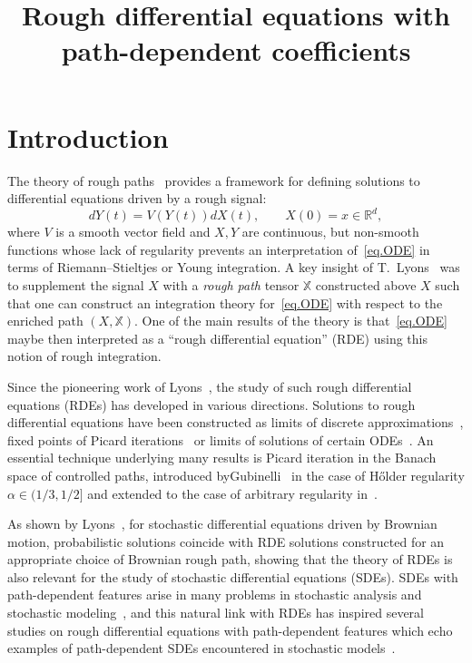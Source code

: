 \documentclass[AHL,Unicode,longabstracts,published]{cedram}
\title[Path-dependent RDEs]{Rough differential equations with path-dependent coefficients}
\author[A. Ananova]{\firstname{Anna} \lastname{Ananova}}
\newcommand{\bbX}{\mathbb{X}}
\newcommand{\Rr}{{\mathbb{R}}}
\begin{document}
\maketitle




\section{Introduction}

The theory of rough paths~\cite{lyons} provides a framework for defining solutions to differential equations driven by a rough signal:
\begin{equation}\label{eq.ODE}
dY(t)= V(Y(t)) dX(t),\qquad X(0)=x\in \Rr^d,
\end{equation}
where $V$ is a smooth vector field and $X, Y$ are continuous, but non-smooth functions whose lack of regularity prevents an interpretation of~\eqref{eq.ODE} in terms of Riemann--Stieltjes or Young integration. A key insight of T.~Lyons~\cite{lyons98} was to supplement the signal $X$ with a \emph{rough path} tensor $\bbX$ constructed above $X$ such that one can construct an integration theory for~\eqref{eq.ODE} with respect to the enriched path $(X,\bbX)$. One of the main results of the theory is that~\eqref{eq.ODE} maybe then interpreted as a ``rough differential equation'' (RDE) using this notion of rough integration.

Since the pioneering work of Lyons~\cite{lyons98,lyons2007}, the study of such rough differential equations (RDEs) has developed in various directions. Solutions to rough differential equations have been constructed as limits of discrete approximations~\cite{davie2008}, fixed points of Picard iterations~\cite{frizhairer,gubinelli2004,lyons2007,lyons98} or limits of solutions of certain ODEs~\cite{bailleul2015, frizvictoir}. An essential technique underlying many results is Picard iteration in the Banach space of controlled paths, introduced by\linebreak Gubinelli~\cite{gubinelli2004} in the case of H\H older regularity $\alpha\in (1/3,1/2]$ and extended to the case of arbitrary regularity in~\cite{gubinelli2010,hairer2014}.


As shown by Lyons~\cite{lyons98}, for stochastic differential equations driven by Brownian motion, probabilistic solutions coincide with RDE solutions constructed for an appropriate choice of Brownian rough path, showing that the theory of RDEs is also relevant for the study of stochastic differential equations (SDEs). SDEs with path-dependent features arise in many problems in stochastic analysis and stochastic modeling~\cite{ItoNis, Kush, Moh}, and this natural link with RDEs has inspired several studies on rough differential equations with path-dependent features which echo examples of path-dependent SDEs encountered in stochastic models~\cite{bailleul2014, deya2019,neuenkirch2008,aida2019}.
\end{document}
